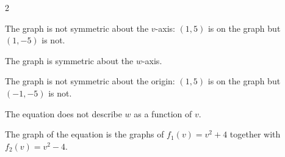 \documentclass{ximera}
\begin{document}
\begin{multicols}{2}
\begin{enumerate}
\begin{flushleft}
\smallskip

The graph is not symmetric about the $v$-axis:  $(1,5)$ is on the graph but $(1,-5)$ is not. \smallskip

The graph is  symmetric about the $w$-axis. \smallskip

The graph is not symmetric about the origin: $(1,5)$ is on the graph but $(-1, -5)$ is not.  \smallskip

The equation does not describe $w$ as a function of $v$.  \smallskip

The graph of the equation is the graphs of $f_{1}(v) = v^2+4$ together with $f_{2}(v) = v^2-4$.

\end{flushleft}

\setcounter{HW}{\value{enumi}}
\end{enumerate}
\end{multicols}
\end{document}
